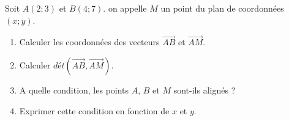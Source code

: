 
Soit $A(2;3)$ et $B(4;7)$. on appelle $M$ un point du plan de coordonnées $(x;y)$. 
\begin{enumerate}
\item Calculer les coordonnées des vecteurs $\overrightarrow{AB}$ et $\overrightarrow{AM}$.
\item Calculer $dét(\overrightarrow{AB},\overrightarrow{AM})$.
\item A quelle condition, les points $A$, $B$ et $M$ sont-ils alignés ?
\item Exprimer cette condition en fonction de $x$ et $y$.
\end{enumerate}